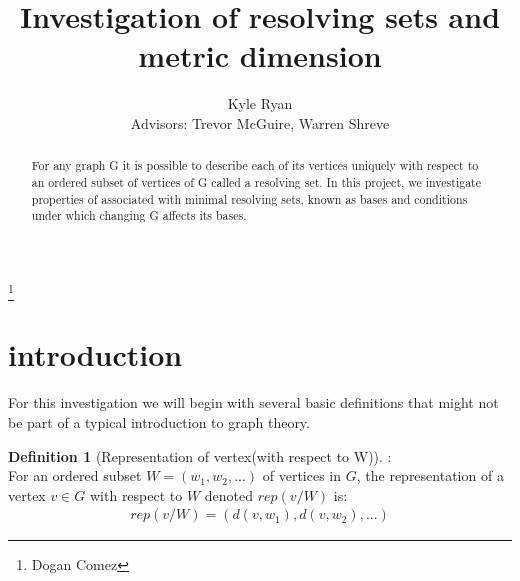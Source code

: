 \documentclass[11pt]{amsart}
\theoremstyle{plain}  %
\theoremstyle{definition}
\newtheorem{defin}[thm]{{Definition}}
\theoremstyle{remark}
\numberwithin{equation}{thm}
\begin{document}
\title[Abstract Algebra Project]{Investigation of resolving sets and metric dimension}
\thanks{Dogan Comez}
\author[K.~ R. Ryan]{Kyle Ryan\\{Advisors: Trevor McGuire, Warren Shreve}}


\address{Department of Mathematics 2750\\ North Dakota State University\\PO BOX 6050\\ Fargo, ND 58108-6050\\ USA}






\maketitle


\begin{abstract}
        For any graph G it is possible to describe each of its vertices uniquely with respect to an ordered subset of vertices of G called a resolving set.
    In this project, we investigate properties of associated with minimal resolving sets, known as bases and conditions under which changing G affects its bases. 
\end{abstract}


\section{introduction}

    For this investigation we will begin with several basic definitions that might not be part of a typical introduction to graph theory.

 \begin{defin}[Representation of vertex(with respect to W)]:\\
    For an ordered subset $W=(w_1, w_2, ...)$ of vertices in $G$, the representation of a vertex $v \in G$ with respect to $W$ denoted $rep(v/W)$ is:
  \begin{align*}
  rep(v/W)=(d(v,w_1), d(v,w_2), ...)
  \end{align*}
 \end{defin}
    
\end{document}
